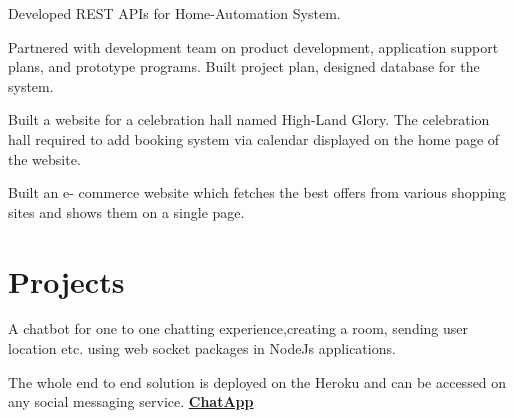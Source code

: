 \documentclass[]{deedy-resume-openfont}
\begin{document}
\begin{minipage}[t]{0.66\textwidth}
\begin{tightemize}
\item Developed REST APIs for Home-Automation System.
\item Partnered with development team on product development,
application support plans, and prototype programs. Built project plan,
designed database for the system.
\end{tightemize}
\sectionsep

\begin{tightemize}
\item 
Built a website for a celebration hall
named High-Land Glory. The celebration hall required to add booking system
via calendar displayed on the home page of the website.
\end{tightemize}
\sectionsep

\begin{tightemize}
\item 
Built an e- commerce website which fetches
the best offers from various shopping sites and shows them on a single page.
\end{tightemize}
\sectionsep

\section{Projects}
\begin{tightemize}
\item A chatbot for one to one chatting experience,creating a room, sending user location etc. using web socket packages in NodeJs applications.
\item The whole end to end solution is deployed on the Heroku and can be accessed on any social messaging service.
\bf
\href{https://chat-app-j07.herokuapp.com/}{ChatApp}{}
\end{tightemize}
\sectionsep


\end{minipage}
\end{document}
